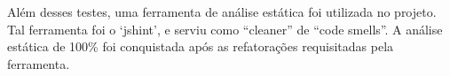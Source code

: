 Além desses testes, uma ferramenta de análise estática foi utilizada no projeto. Tal ferramenta 
foi o ‘jshint’, e serviu como “cleaner” de “code smells”. A análise estática de 100\% foi conquistada após as refatorações requisitadas pela ferramenta.


















